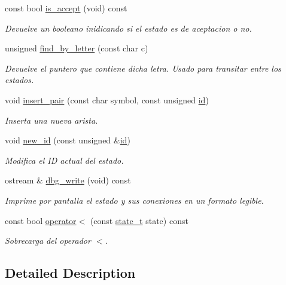 \begin{DoxyCompactItemize}
const bool \hyperlink{classstate__t_a83874dc98292ca29be83680dee6f9456}{is\+\_\+accept} (void) const
\begin{DoxyCompactList}\small\item\em Devuelve un booleano inidicando si el estado es de aceptacion o no. \end{DoxyCompactList}\item 
unsigned \hyperlink{classstate__t_a716e1078c9486ebb9686dfc97d5749c7}{find\+\_\+by\+\_\+letter} (const char c)
\begin{DoxyCompactList}\small\item\em Devuelve el puntero que contiene dicha letra. Usado para transitar entre los estados. \end{DoxyCompactList}\item 
void \hyperlink{classstate__t_a8a18ea542fd131b22dfee5897caab79e}{insert\+\_\+pair} (const char symbol, const unsigned \hyperlink{classstate__t_ade808c541a78e337c021020842e3c21d}{id})
\begin{DoxyCompactList}\small\item\em Inserta una nueva arista. \end{DoxyCompactList}\item 
void \hyperlink{classstate__t_a541e80fbf886c337d53c0e5614f0c38b}{new\+\_\+id} (const unsigned \&\hyperlink{classstate__t_ade808c541a78e337c021020842e3c21d}{id})
\begin{DoxyCompactList}\small\item\em Modifica el ID actual del estado. \end{DoxyCompactList}\item 
ostream \& \hyperlink{classstate__t_a4cbecc58710974534b8f1dc0592b9ae1}{dbg\+\_\+write} (void) const
\begin{DoxyCompactList}\small\item\em Imprime por pantalla el estado y sus conexiones en un formato legible. \end{DoxyCompactList}\item 
const bool \hyperlink{classstate__t_aef60c051e68f523c809033f2e9bdd202}{operator$<$} (const \hyperlink{classstate__t}{state\+\_\+t} state) const
\begin{DoxyCompactList}\small\item\em Sobrecarga del operador \textquotesingle{}$<$\textquotesingle{}. \end{DoxyCompactList}\end{DoxyCompactItemize}


\subsection{Detailed Description}


